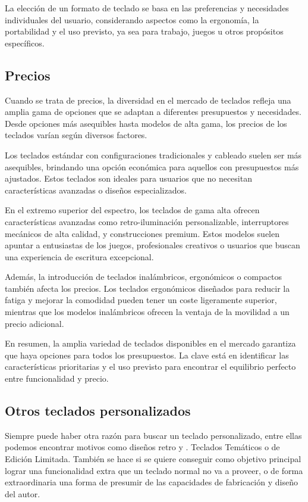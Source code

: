 La elección de un formato de teclado se basa en las preferencias y necesidades individuales del usuario, considerando aspectos como la ergonomía, la portabilidad y el uso previsto, ya sea para trabajo, juegos u otros propósitos específicos. \cite{Keyboards-types}

\subsection{Precios}
Cuando se trata de precios, la diversidad en el mercado de teclados refleja una amplia gama de opciones que se adaptan a diferentes presupuestos y necesidades. Desde opciones más asequibles hasta modelos de alta gama, los precios de los teclados varían según diversos factores.

Los teclados estándar con configuraciones tradicionales y cableado suelen ser más asequibles, brindando una opción económica para aquellos con presupuestos más ajustados. Estos teclados son ideales para usuarios que no necesitan características avanzadas o diseños especializados.

En el extremo superior del espectro, los teclados de gama alta ofrecen características avanzadas como retro-iluminación personalizable, interruptores mecánicos de alta calidad, y construcciones premium. Estos modelos suelen apuntar a entusiastas de los juegos, profesionales creativos o usuarios que buscan una experiencia de escritura excepcional.

Además, la introducción de teclados inalámbricos, ergonómicos o compactos también afecta los precios. Los teclados ergonómicos diseñados para reducir la fatiga y mejorar la comodidad pueden tener un coste ligeramente superior, mientras que los modelos inalámbricos ofrecen la ventaja de la movilidad a un precio adicional.

En resumen, la amplia variedad de teclados disponibles en el mercado garantiza que haya opciones para todos los presupuestos. La clave está en identificar las características prioritarias y el uso previsto para encontrar el equilibrio perfecto entre funcionalidad y precio. \cite{Keyboards-Prices}

\subsection{Otros teclados personalizados}
Siempre puede haber otra razón para buscar un teclado personalizado, entre ellas podemos encontrar motivos como diseños retro y . Teclados Temáticos o de Edición Limitada. 
También se hace si se quiere  conseguir como objetivo principal lograr una funcionalidad extra que un teclado normal no va a proveer, o de forma extraordinaria una forma de presumir de las capacidades de fabricación y diseño del autor.